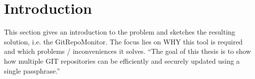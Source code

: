 \section{Introduction}\label{introduction}

This section gives an introduction to the problem and sketches the resulting solution, i.e. the GitRepoMonitor.
The focus lies on WHY this tool is required and which problems / inconveniences it solves.
``The goal of this thesis is to show how multiple GIT repositories can be efficiently and securely updated using a single passphrase.''
